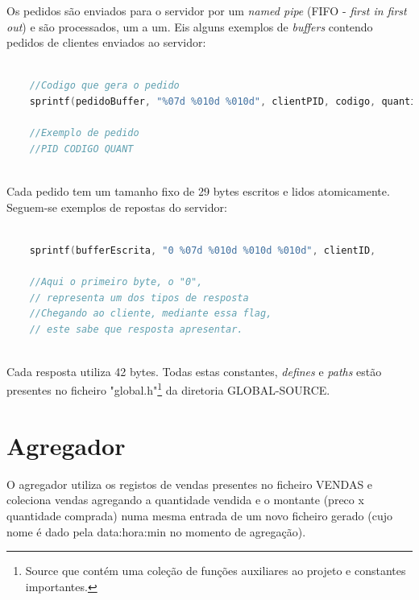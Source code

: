 \documentclass[a4paper,11pt]{report}
\begin{document}
\hspace{0.50cm} Os pedidos são enviados para o servidor por um \textit{named pipe} (FIFO - \textit{first in first out}) e são processados, um a um. Eis alguns exemplos de \textit{buffers} contendo pedidos de clientes enviados ao servidor:
   
   
\begin{lstlisting}[language=C]
    
    //Codigo que gera o pedido
    sprintf(pedidoBuffer, "%07d %010d %010d", clientPID, codigo, quantidade);
    
    //Exemplo de pedido
    //PID CODIGO QUANT
    
\end{lstlisting}
   
   \vspace{0.5cm}
   
    Cada pedido tem um tamanho fixo de 29 bytes escritos e lidos atomicamente. Seguem-se exemplos de repostas do servidor:
   
\begin{lstlisting}[language=C]
    
    sprintf(bufferEscrita, "0 %07d %010d %010d %010d", clientID,         codigoProduto,  quantidadeStock, precoLido);
	
	//Aqui o primeiro byte, o "0", 
	// representa um dos tipos de resposta
	//Chegando ao cliente, mediante essa flag, 
	// este sabe que resposta apresentar.
										   
\end{lstlisting}

\vspace{1.0cm}

Cada resposta utiliza 42 bytes. Todas estas constantes, \textit{defines} e \textit{paths} estão presentes no ficheiro "global.h"\footnote{Source que contém uma coleção de funções auxiliares ao projeto e constantes importantes.} da diretoria GLOBAL-SOURCE.

\section{Agregador}

\hspace{0.50cm} O agregador utiliza os registos de vendas presentes no ficheiro VENDAS e coleciona vendas agregando a quantidade vendida e o montante (preco x quantidade comprada) numa mesma entrada de um novo ficheiro gerado (cujo nome é dado pela data:hora:min no momento de agregação).
\end{document}

